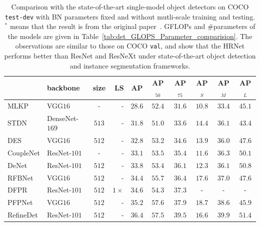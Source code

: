 \documentclass[10pt,journal,compsoc]{IEEEtran}
\begin{document}
\renewcommand{\arraystretch}{1.3}
    \begin{table}[ht]
	\setlength{\tabcolsep}{12pt}
	\centering
	\caption{Comparison with the state-of-the-art single-model object detectors on COCO \texttt{test-dev} with BN parameters fixed and without mutli-scale training and testing.
	$^*$ means that the result
	is from the original paper~\cite{CaiV18}.
	GFLOPs and \#parameters of the models 
	are given in Table~\ref{tab:det_GLOPS_Parameter_comparision}.
	{
	The observations are similar to those 
	on COCO \texttt{val},
	and show that 
	the HRNet performs better than ResNet and ResNeXt
	under state-of-the-art object detection 
	and instance segmentation frameworks.}}
	\scriptsize
	\label{tab:recent_object_detection_results_single}
	\vspace{-3mm}
	\begin{tabular}{l|lcr|ccc|ccc}%
    	\hline %
    	 & backbone & size & LS & AP & AP$_{50}$ & AP$_{75}$ & AP$_S$ & AP$_M$ & AP$_L$\\

		\hline
		
		\hline
		MLKP \cite{WangWGLZ18} & VGG$16$ & - & - &  $28.6$ & $52.4$ & $31.6$ & $10.8$ & $33.4$ & $45.1$ \\   
		
		STDN \cite{ZhouNGHX18} & DenseNet-$169$ & $513$ & - & $31.8$ & $51.0$ & $33.6$ & $14.4$ & $36.1$ & $43.4$\\
		
		DES \cite{ZhangQX0WY18} & VGG$16$ & $512$  & - & $32.8$ & $53.2$ & $34.6$ & $13.9$ & $36.0$ & $47.6$ \\ 
		CoupleNet \cite{ZhuZWZWL17} & ResNet-$101$ & - & - & $33.1$ & $53.5$ & $35.4$ & $11.6$ & $36.3$ & $50.1$ \\
		DeNet \cite{Tychsen-SmithP17} & ResNet-$101$ & $512$ & - & $33.8$ & $53.4$ & $36.1$ & $12.3$ & $36.1$ & $50.8$ \\
	    RFBNet \cite{LiuHW18} & VGG$16$ & $512$ & -  & $34.4$ & $55.7$ &  $36.4$ & $17.6$ & $37.0$ & $47.6$ \\    
		DFPR \cite{KongSHL18} & ResNet-$101$ & $512$ & $1\times$ & $34.6$ & $54.3$ & $37.3$ & - & - & - \\

	    PFPNet \cite{KimKSKK18} & VGG$16$ & $512$ & - & $35.2$ & $57.6$ &  $37.9$ & $18.7$ & $38.6$ & $45.9$ \\   
	    
	    RefineDet\cite{ZhangWBLL18} & ResNet-$101$ & $512$ & - & $36.4$ & $57.5$ & $39.5$ & $16.6$ & $39.9$ & $51.4$  \\  


\end{tabular}
\end{table}
\end{document}
